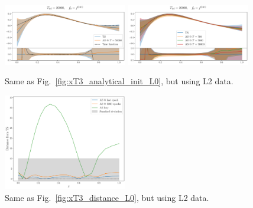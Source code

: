 \begin{figure}[h]
    \centering
    \includegraphics[width=0.48\textwidth]{plots/analytical_solution/pdf_plot_init_last_epoch_L2.pdf}
    \includegraphics[width=0.48\textwidth]{plots/analytical_solution/pdf_plot_init_epochs_L2.pdf}
    \caption{Same as Fig.~\ref{fig:xT3_analytical_init_L0}, but using L2 data.}
    \label{fig:xT3_analytical_init_L2}
  \end{figure}
  \begin{figure}[h]
    \centering
    \includegraphics[width=0.48\textwidth]{plots/analytical_solution/distance_plot_L2.pdf}
    \caption{Same as Fig.~\ref{fig:xT3_distance_L0}, but using L2 data.}
    \label{fig:xT3_distance_L2}
  \end{figure}


